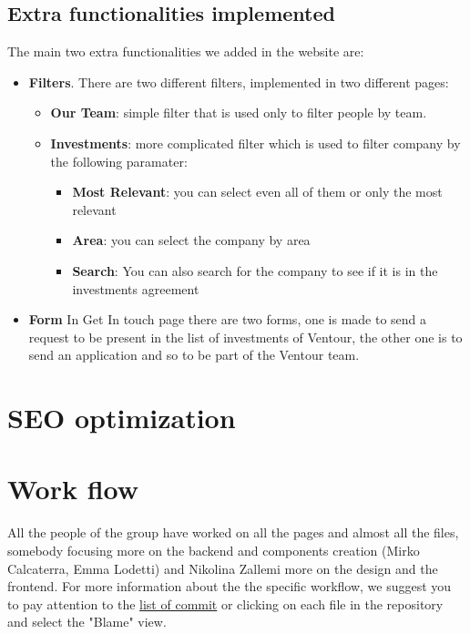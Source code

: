 \documentclass[12pt]{article}
\begin{document}
\subsection{Extra functionalities implemented}
The main two extra functionalities we added in the website are:
\begin{itemize}
    \item \textbf{Filters}. There are two different filters, implemented in two different pages:
    \begin{itemize}
        \item \textbf{Our Team}: simple filter that is used only to filter people by team. 
        \item \textbf{Investments}: more complicated filter which is used to filter company by the following paramater:
        \begin{itemize}
            \item \textbf{Most Relevant}: you can select even all of them or only the most relevant
            \item \textbf{Area}: you can select the company by area
            \item \textbf{Search}: You can also search for the company to see if it is in the investments agreement
        \end{itemize}
    \end{itemize}
    \item \textbf{Form} In Get In touch page there are two forms, one is made to send a request to be present in the list of investments of Ventour, the other one is to send an application and so to be part of the Ventour team.
\end{itemize}

\section{SEO optimization}

\section{Work flow}
All the people of the group have worked on all the pages and almost all the files, somebody focusing more on the backend and components creation (Mirko Calcaterra, Emma Lodetti) and Nikolina Zallemi more on the design and the frontend. For more information about the the specific workflow, we suggest you to pay attention to the \href{https://github.com/Rkomi98/VenTour/commits/main}{list of commit} or clicking on each file in the repository and select the "Blame" view.

    
\end{document}
